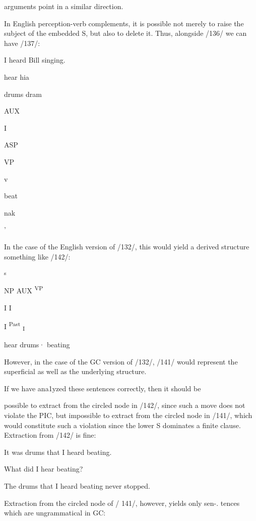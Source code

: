 arguments point in a similar direction.

In English perception-verb complements, it is possible not merely to raise the subject of the embedded S, but also to delete it. Thus, alongside /136/ we can have /137/:

\ea\label{ex:136}
 I heard Bill singing.
\glt
\z

hear hia

drums dram

AUX

I

ASP

VP

v 

beat

nak

'


In the case of the English version of /132/, this would yield a derived structure something like /142/:

\ea\label{ex:142}
 \textsuperscript{s} 
\glt
\z

  


    


 

NP AUX \textsuperscript{VP}

I I

I \textsuperscript{Past}\textsubscript{ }\textsubscript{I}

hear drums· beating

However, in the case of the GC version of /132/, /141/ would represent the superficial as well as the underlying structure.

If we have ana1yzed these sentences correctly, then it should be

possible to extract from the circled node in /142/, since such a move does not violate the PIC, but impossible to extract from the circled node in /141/, which would constitute such a violation since the lower S dominates a finite clause. Extraction from /142/ is fine:

\ea\label{ex:143}
 It was drums that I heard beating.
\glt
\z

\ea\label{ex:144}
 What did I hear beating?
\glt
\z

\ea\label{ex:145}
 The drums that I heard beating never stopped.
\glt
\z

Extraction from the circled node of / 141/, however, yields only sen{}-. tences which are ungrammatical in GC:

